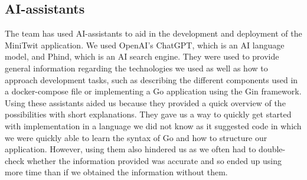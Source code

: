 \subsection{AI-assistants}
The team has used AI-assistants to aid in the development and deployment of the MiniTwit application. We used OpenAI's ChatGPT, which is an AI language model, 
and Phind, which is an AI search engine. They were used to provide general information regarding the technologies we used as well as how to approach development tasks,
such as describing the different components used in a docker-compose file or implementing a Go application using the Gin framework. \\
  
Using these assistants aided us because they provided a quick overview of the possibilities with short explanations. They gave us a way to quickly get started with
implementation in a language we did not know as it suggested code in which we were quickly able to learn the syntax of Go and how to structure our application. However, 
using them also hindered us as we often had to double-check whether the information provided was accurate and so ended up using more time than if we obtained the information 
without them. 